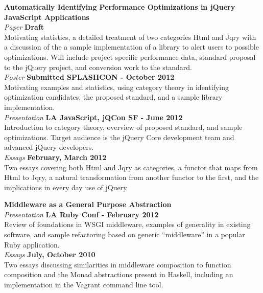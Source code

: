 \documentclass[margin,line]{resume}
\begin{document}
\begin{resume}
    \textbf{Automatically Identifying Performance Optimizations in jQuery JavaScript Applications}\\
    \textsl{Paper} \hfill \textbf{Draft}\\
    Motivating statistics, a detailed treatment of two categories Html and Jqry with a discussion of the a sample implementation of a library to alert users to possible optimizations. Will include project specific performance data, standard proposal to the jQuery project, and conversion work to the standard.
    \vspace{1mm}\\
    \textsl{Poster} \hfill \textbf{Submitted SPLASHCON - October 2012}\\
    Motivating examples and statistics, using category theory in identifying optimization candidates, the proposed standard, and a sample library implementation.
    \vspace{1mm}\\
    \textsl{Presentation} \hfill \textbf{LA JavaScript, jQCon SF - June 2012}\\
    Introduction to category theory, overview of proposed standard, and sample optimizations. Target audience is the jQuery Core development team and advanced jQuery developers.
    \vspace{1mm}\\
    \textsl{Essays} \hfill \textbf{February, March 2012}\\
    Two essays covering both Html and Jqry as categories, a functor that maps from Html to Jqry, a natural transformation from another functor to the first, and the implications in every day use of jQuery

    \textbf{Middleware as a General Purpose Abstraction}\\
    \textsl{Presentation} \hfill \textbf{LA Ruby Conf - February 2012}\\
    Review of foundations in WSGI middleware, examples of generality in existing software, and sample refactoring based on generic ``middleware'' in a popular Ruby application.
    \vspace{1mm}\\
    \textsl{Essays} \hfill \textbf{July, October 2010}\\
    Two essays discussing similarities in middleware composition to function composition and the Monad abstractions present in Haskell, including an implementation in the Vagrant command line tool.
    \vspace{1mm}\\


\end{resume}
\end{document}
